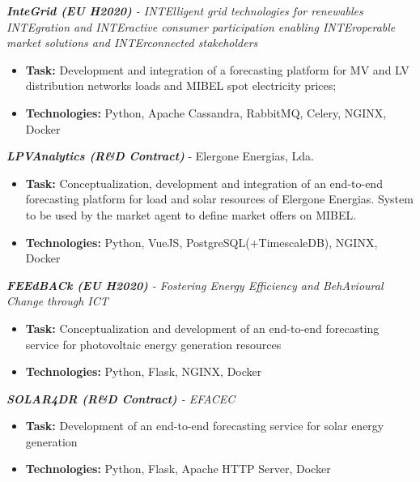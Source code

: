 \documentclass{mycv}
\begin{document}
\begin{myitemize}
	\vspace{0.15cm}	
	\item \textit{\textbf{InteGrid (EU H2020)} - INTElligent grid technologies for renewables INTEgration and INTEractive consumer participation enabling INTEroperable market solutions and INTErconnected stakeholders}
	\begin{itemize}
		\item \textbf{Task:} Development and integration of a forecasting platform for MV and LV distribution networks loads and MIBEL spot electricity prices;
		\item \textbf{Technologies:} Python, Apache Cassandra, RabbitMQ, Celery, NGINX, Docker
	\end{itemize}


	\vspace{0.15cm}	
	\item \textit{\textbf{LPVAnalytics (R\&D Contract)}} - Elergone Energias, Lda.
	\begin{itemize}
		\item \textbf{Task:} Conceptualization, development and integration of an end-to-end forecasting platform for load and solar resources of Elergone Energias. System to be used by the market agent to define market offers on MIBEL.
		\item \textbf{Technologies:} Python, VueJS, PostgreSQL(+TimescaleDB), NGINX, Docker
	\end{itemize}

	\vspace{0.15cm}	
	\item \textit{\textbf{FEEdBACk (EU H2020)} - Fostering Energy Efficiency and BehAvioural Change through ICT}
	\begin{itemize}
		\item \textbf{Task:} Conceptualization and development of an end-to-end forecasting service for photovoltaic energy generation resources
		\item \textbf{Technologies:} Python, Flask, NGINX, Docker
	\end{itemize}
	
	\vspace{0.15cm}	
	\item \textit{\textbf{SOLAR4DR (R\&D Contract)} - EFACEC}
	\begin{itemize}
		\item \textbf{Task:} Development of an end-to-end forecasting service for solar energy generation
		\item \textbf{Technologies:} Python, Flask, Apache HTTP Server, Docker
	\end{itemize}
		

\end{myitemize}
\end{document}
